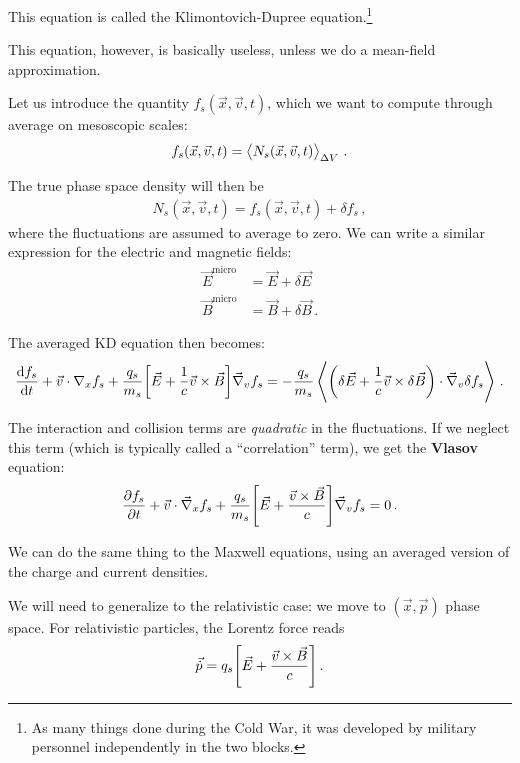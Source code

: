 \documentclass[main.tex]{subfiles}
\begin{document}
This equation is called the Klimontovich-Dupree equation.\footnote{As many things done during the Cold War, it was developed by military personnel independently in the two blocks. } 

This equation, however, is basically useless, unless we do a mean-field approximation. 

Let us introduce the quantity \(f_s (\vec{x}, \vec{v}, t)\), which we want to compute through average on mesoscopic scales: 
%
\begin{align}
f_s (\vec{x}, \vec{v}, t) = \expval{N_s (\vec{x}, \vec{v}, t)}_{\Delta V}
\,.
\end{align}

The true phase space density will then be 
%
\begin{align}
N_s (\vec{x}, \vec{v}, t) = f_s (\vec{x}, \vec{v}, t) + \delta f_s
\,,
\end{align}
%
where the fluctuations are assumed to average to zero. 
We can write a similar expression for the electric and magnetic fields: 
%
\begin{align}
\vec{E}^{\text{micro}} &= \vec{E} + \delta \vec{E} \\
\vec{B}^{\text{micro}} &= \vec{B} + \delta \vec{B}
\,.
\end{align}

The averaged KD equation then becomes: 
%
\begin{align}
\dv{f_s}{t} + \vec{v} \cdot \nabla_x f_s + \frac{q_s}{m_s} 
\qty[\vec{E} + \frac{1}{c} \vec{v} \times \vec{B}] \vec{\nabla}_v f_s = - \frac{q_s}{m_s} \expval{
    \qty( \delta \vec{E} + \frac{1}{c} \vec{v} \times \delta \vec{B} ) \cdot \vec{\nabla}_v \delta f_s
}
\,.
\end{align}

The interaction and collision terms are \emph{quadratic} in the fluctuations. 
If we neglect this term (which is typically called a ``correlation'' term), we get the \textbf{Vlasov} equation: 
%
\begin{align}
\pdv{f_s}{t} + \vec{v} \cdot \vec{\nabla}_x f_s + \frac{q_s}{m_s} \qty[ \vec{E} + \frac{\vec{v} \times \vec{B}}{c}] \vec{\nabla}_v f_s = 0
\,.
\end{align}

We can do the same thing to the Maxwell equations, using an averaged version of the charge and current densities.

We will need to generalize to the relativistic case: we move to \((\vec{x}, \vec{p})\) phase space. 
For relativistic particles, the Lorentz force reads 
%
\begin{align}
\vec{\dot{p}} = q_s \qty[\vec{E} + \frac{\vec{v} \times \vec{B}}{c}]
\,.
\end{align}
\end{document}
